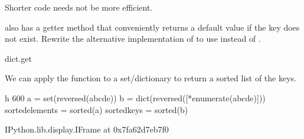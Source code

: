 \documentclass[letterpaper,10pt,english]{sphinxmanual}
\begin{document}
Shorter code needs not be more efficient.

  also has a getter method  that conveniently returns a default value if the key does not exist. Rewrite the alternative implementation of  to use  instead of .

\begin{sphinxVerbatim}[commandchars=\\\{\}]
dict.get
 
      
        
        \PYG{p}{[}\PYG{p}{]}    
     

\end{sphinxVerbatim}

\noindent{}


We can apply the function  to a set/dictionary to return a sorted list of the keys.

\begin{sphinxVerbatim}[commandchars=\\\{\}]
 \PYGZhy{}h 600
a = set(reversed(\PYGZsq{}abcde\PYGZsq{}))
b = dict(reversed([*enumerate(\PYGZsq{}abcde\PYGZsq{})]))
sorted\PYGZus{}elements = sorted(a)
sorted\PYGZus{}keys = sorted(b)
\end{sphinxVerbatim}

\begin{sphinxVerbatim}[commandchars=\\\{\}]
\PYGZlt{}IPython.lib.display.IFrame at 0x7fa62d7eb7f0\PYGZgt{}
\end{sphinxVerbatim}
\end{document}
